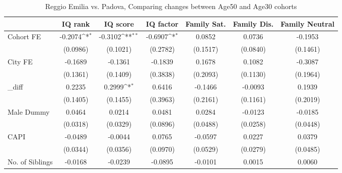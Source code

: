 \begin{table}[htbp]\centering
\def\sym#1{\ifmmode^{#1}\else\(^{#1}\)\fi}
\caption{Reggio Emilia vs. Padova, Comparing changes between Age50 and Age30 cohorts}
\begin{tabular}{l*{6}{c}}
\toprule
            &\multicolumn{1}{c}{IQ rank}&\multicolumn{1}{c}{IQ score}&\multicolumn{1}{c}{IQ factor}&\multicolumn{1}{c}{Family Sat.}&\multicolumn{1}{c}{Family Dis.}&\multicolumn{1}{c}{Family Neutral}\\
\midrule
Cohort FE   &     -0.2074\sym{*}  &     -0.3102\sym{**} &     -0.6907\sym{*}  &      0.0852         &      0.0736         &     -0.1953         \\
            &    (0.0986)         &    (0.1021)         &    (0.2782)         &    (0.1517)         &    (0.0840)         &    (0.1461)         \\
\addlinespace
City FE     &     -0.1689         &     -0.1361         &     -0.1839         &      0.1678         &      0.1082         &     -0.3087         \\
            &    (0.1361)         &    (0.1409)         &    (0.3838)         &    (0.2093)         &    (0.1130)         &    (0.1964)         \\
\addlinespace
\_diff       &      0.2235         &      0.2999\sym{*}  &      0.6416         &     -0.1466         &     -0.0093         &      0.1939         \\
            &    (0.1405)         &    (0.1455)         &    (0.3963)         &    (0.2161)         &    (0.1161)         &    (0.2019)         \\
\addlinespace
Male Dummy  &      0.0464         &      0.0214         &      0.0481         &      0.0284         &     -0.0123         &     -0.0185         \\
            &    (0.0318)         &    (0.0329)         &    (0.0896)         &    (0.0488)         &    (0.0258)         &    (0.0448)         \\
\addlinespace
CAPI        &     -0.0489         &     -0.0044         &      0.0765         &     -0.0597         &      0.0227         &      0.0379         \\
            &    (0.0344)         &    (0.0356)         &    (0.0970)         &    (0.0529)         &    (0.0279)         &    (0.0485)         \\
\addlinespace
No. of Siblings&     -0.0168         &     -0.0239         &     -0.0895         &     -0.0101         &      0.0015         &      0.0060         \\

\end{tabular}
\end{table}
